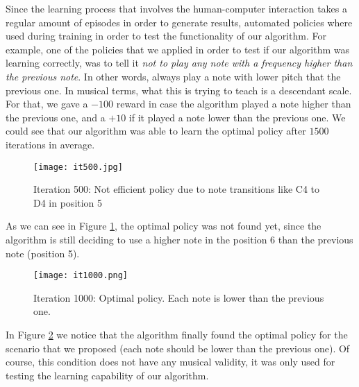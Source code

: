 Since the learning process that involves the human-computer interaction takes a regular amount of episodes in order to generate results, automated policies where used during training in order to test the functionality of our algorithm. For example, one of the policies that we applied in order to test if our algorithm was learning correctly, was to tell it \emph{not to play any note with a frequency higher than the previous note}. In other words, always play a note with lower pitch that the previous one. In musical terms, what this is trying to teach is a descendant scale. For that, we gave a $ -100 $ reward in case the algorithm played a note higher than the previous one, and a $ +10 $ if it played a note lower than the previous one. We could see that our algorithm was able to learn the optimal policy after $ 1500 $ iterations in average.

\begin{figure}[h]
  \texttt{[image: it500.jpg]}
  \caption{Iteration 500: Not efficient policy due to note transitions like C4 to D4 in position 5}
  \label{fig:it500}
\end{figure}

As we can see in Figure \ref{fig:it500}, the optimal policy was not found yet, since the algorithm is still deciding to use a higher note in the position 6 than the previous note (position 5).

\begin{figure}[ht]
  \texttt{[image: it1000.png]}
  \caption{Iteration 1000: Optimal policy. Each note is lower than the previous one.}
  \label{fig:it1000}
\end{figure}

\newpage

In Figure \ref{fig:it1000} we notice that the algorithm finally found the optimal policy for the scenario that we proposed (each note should be lower than the previous one). Of course, this condition does not have any musical validity, it was only used for testing the learning capability of our algorithm.

